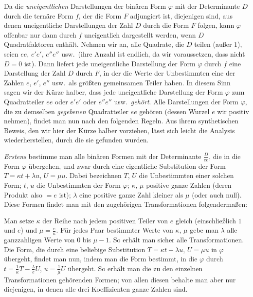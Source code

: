 Da die \textit{uneigentlichen} Darstellungen der binären Form $\varphi$
mit der Determinante $D$ durch die ternäre Form $f$, der die
Form $F$ adjungiert ist, diejenigen sind, aus denen uneigentliche
Darstellungen
der Zahl $D$ durch die Form $F$ folgen, kann $\varphi$ offenbar
nur dann durch $f$ uneigentlich dargestellt werden, wenn $D$
Quadratfaktoren enthält. Nehmen wir an, alle Quadrate, die $D$ teilen
(außer $1$), seien $ee$, $e'e'$, $e''e''$ usw.\ (ihre Anzahl
ist endlich, da wir voraussetzen, dass nicht $D=0$ ist). Dann liefert
jede uneigentliche Darstellung der Form $\varphi$ durch $f$ eine
Darstellung der Zahl $D$ durch $F$, in der die Werte der
Unbestimmten eine der Zahlen $e$, $e'$, $e''$ usw.\ als größten
gemeinsamen Teiler haben. In diesem Sinn sagen wir der Kürze halber,
dass jede uneigentliche Darstellung der Form $\varphi$ zum Quadratteiler
$ee$ oder $e'e'$ oder $e''e''$ usw.\ \textit{gehört}. Alle Darstellungen
der Form $\varphi$, die zu demselben \textit{gegebenen} Quadratteiler
$ee$ gehören (dessen Wurzel $e$ wir positiv nehmen), findet man
nun nach den folgenden Regeln. Aus ihrem synthetischen Beweis, den wir
hier der Kürze halber vorziehen, lässt sich leicht die Analysis wiederherstellen,
durch die sie gefunden wurden.

\textit{Erstens} bestimme man alle binären Formen mit der Determinante
$\frac{D}{ee}$, die in die Form $\varphi$ übergehen, und zwar durch eine eigentliche
Substitution der Form $T=\kappa t+\lambda u$, $U=\mu u$. Dabei bezeichnen $T$,
$U$ die Unbestimmten einer solchen Form; $t$, $u$ die
Unbestimmten der Form $\varphi$; $\kappa$, $\mu$ positive ganze Zahlen
(deren Produkt also $=e$ ist); $\lambda$ eine positive ganze Zahl
kleiner als $\mu$ (oder auch null). Diese Formen findet man mit den
zugehörigen Transformationen folgendermaßen:

Man setze $\kappa$ der Reihe nach jedem positiven Teiler von $e$
gleich (einschließlich $1$ und $e$) und $\mu=\frac{e}{\kappa}$. Für jedes
Paar bestimmter Werte von $\kappa$, $\mu$ gebe man $\lambda$ alle
ganzzahligen Werte von $0$ bis $\mu-1$. So erhält man sicher alle
Transformationen. Die Form, die durch eine beliebige Substitution
$T=\kappa t+\lambda u$, $U=\mu u$ in $\varphi$ übergeht, findet man nun, indem man die
Form bestimmt, in die $\varphi$ durch $t=\frac{1}{\kappa}T-\frac{\lambda}{e}U$, $u=\frac{1}{\mu}U$ übergeht. So
erhält man die zu den einzelnen Transformationen gehörenden Formen;
von allen diesen behalte man aber nur diejenigen, in denen alle drei
Koeffizienten ganze Zahlen sind.

